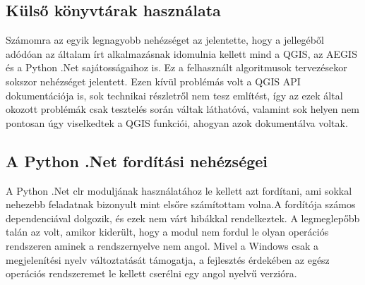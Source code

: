 \subsection{Külső könyvtárak használata}
Számomra az egyik legnagyobb nehézséget az jelentette, hogy a jellegéből adódóan az általam írt alkalmazásnak idomulnia kellett mind a QGIS, az AEGIS és a Python .Net sajátosságaihoz is. Ez a felhasznált algoritmusok tervezésekor sokszor nehézséget jelentett. Ezen kívül problémás volt a QGIS API dokumentációja is, sok technikai részletről nem tesz említést, így az ezek által okozott problémák csak tesztelés során váltak láthatóvá, valamint sok helyen nem pontosan úgy viselkedtek a QGIS funkciói, ahogyan azok dokumentálva voltak.
\subsection{A Python .Net fordítási nehézségei}
A Python .Net clr moduljának használatához le kellett azt fordítani, ami sokkal nehezebb feladatnak bizonyult mint elsőre számítottam volna.A fordítója számos dependenciával dolgozik, és ezek nem várt hibákkal rendelkeztek. A legmeglepőbb talán az volt, amikor kiderült, hogy a modul nem fordul le olyan operációs rendszeren aminek a rendszernyelve nem angol. Mivel a Windows csak a megjelenítési nyelv változtatását támogatja, a fejlesztés érdekében az egész operációs rendszeremet le kellett cserélni egy angol nyelvű verzióra.




